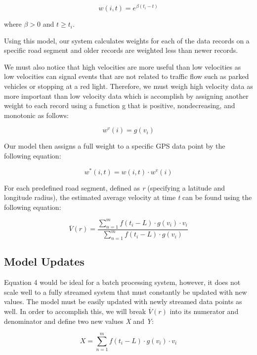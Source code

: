 \documentclass{vldb}
\begin{document}
\begin{equation}w(i,t)=e^{\beta(t_i-t)}\end{equation}

where $\beta > 0$ and $t \geq t_i$.

Using this model, our system calculates weights for each of the data records on a specific road segment and older records are weighted less than newer records. 

We must also notice that high velocities are more useful than low velocities as low velocities can signal events that are not related to traffic flow such as parked vehicles or stopping at a red light. Therefore, we must weigh high velocity data as more important than low velocity data which is accomplish by assigning another weight to each record using a function g that is positive, nondecreasing, and monotonic as follows:

\begin{equation}w^v(i)=g(v_i)\end{equation}

Our model then assigns a full weight to a specific GPS data point by the following equation:

\begin{equation}w^*(i,t)=w(i,t) \cdot w^v(i) \end{equation}

For each predefined road segment, defined as \textit{r} (specifying a latitude and longitude radius), the estimated average velocity at time \textit{t} can be found using the following equation:

\begin{equation}\overline{V}(r)=\frac{\sum_{n=1}^{m} f(t_i - L) \cdot g(v_i) \cdot v_i}{\sum_{n=1}^{m} f(t_i - L) \cdot g(v_i)}\end{equation}


\subsection{Model Updates}

Equation 4 would be ideal for a batch processing system, however, it does not scale well to a fully streamed system that must constantly be updated with new values. The model must be easily updated with newly streamed data points as well. In order to accomplish this, we will break $\overline{V}(r)$ into its numerator and denominator and define two new values \textit{X} and \textit{Y}:

\begin{equation}X = \sum_{n=1}^{m} f(t_i - L) \cdot g(v_i) \cdot v_i\end{equation}
\end{document}
